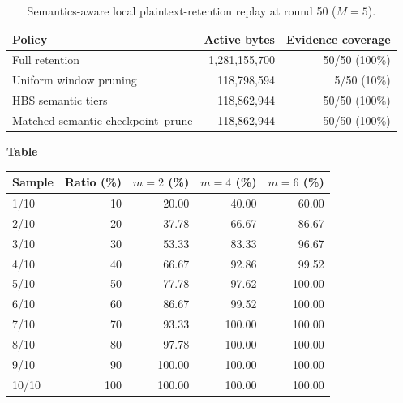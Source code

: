 
\begin{table}[t]
\color{red}
\centering
\caption{Semantics-aware local plaintext-retention replay at round 50 ($M=5$).}
\label{tab:semantic_retention}
\small
\setlength{\tabcolsep}{3.5pt}
\renewcommand{\arraystretch}{1.16}
\begin{tabular*}{\linewidth}{@{\extracolsep{\fill}}lrr@{}}
\toprule
Policy & Active bytes & Evidence coverage \\
\midrule
Full retention & 1,281,155,700 & 50/50 (100\%) \\
Uniform window pruning & 118,798,594 & 5/50 (10\%) \\
HBS semantic tiers & 118,862,944 & 50/50 (100\%) \\
Matched semantic checkpoint--prune & 118,862,944 & 50/50 (100\%) \\
\bottomrule
\end{tabular*}
\end{table}

\noindent\begin{minipage}{\textwidth}
\label{tab:vp_sampling_sensitivity}
\textbf{Table~\thetable}\\
\par\smallskip\centering\small
\setlength{\tabcolsep}{7pt}
\begingroup\color{red}
\begin{tabular}{lrrrr}
\toprule
Sample & Ratio (\%) & $m=2$ (\%) & $m=4$ (\%) & $m=6$ (\%) \\
\midrule
1/10 & 10 & 20.00 & 40.00 & 60.00 \\
2/10 & 20 & 37.78 & 66.67 & 86.67 \\
3/10 & 30 & 53.33 & 83.33 & 96.67 \\
4/10 & 40 & 66.67 & 92.86 & 99.52 \\
5/10 & 50 & 77.78 & 97.62 & 100.00 \\
6/10 & 60 & 86.67 & 99.52 & 100.00 \\
7/10 & 70 & 93.33 & 100.00 & 100.00 \\
8/10 & 80 & 97.78 & 100.00 & 100.00 \\
9/10 & 90 & 100.00 & 100.00 & 100.00 \\
10/10 & 100 & 100.00 & 100.00 & 100.00 \\
\bottomrule
\end{tabular}
\endgroup
\end{minipage}